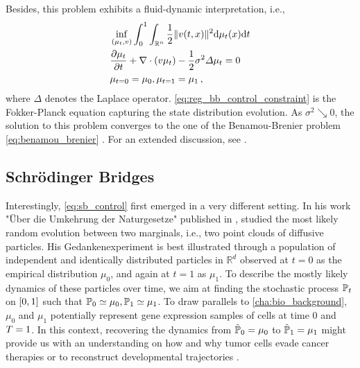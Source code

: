 Besides, this problem exhibits a fluid-dynamic interpretation, i.e.,
\begin{align}
	& \inf _{(\mu_t, v)} \int_0^1 \int_{\mathbb{R}^n}\frac{1}{2}\lVert v(t, x)\rVert^2 \mathrm{d}\mu_t(x) \mathrm{d} t \\
	\label{eq:reg_bb_control_constraint} & \frac{\partial \mu_t}{\partial t}+\nabla \cdot(v \mu_t) - \frac{1}{2}\sigma^2 \Delta \mu_t = 0 \\
	& \nonumber \mu_{t=0}=\mu_0, \mu_{t=1}=\mu_1\,,
\end{align}
where $\Delta$ denotes the Laplace operator.
\eqref{eq:reg_bb_control_constraint} is the Fokker-Planck equation capturing the state distribution evolution.
As $\sigma^2 \searrow 0$, the solution to this problem converges to the one of the Benamou-Brenier problem \eqref{eq:benamou_brenier} \citep{mikami2008optimal}.
For an extended discussion, see \citet{dai1991stochastic, mikami2000dynamical, mikami2002optimal}.


\subsection{Schr{\"o}dinger Bridges} \label{sec:background_sb}

Interestingly, \cref{eq:sb_control} first emerged in a very different setting.
In his work "{\"U}ber die Umkehrung der Naturgesetze" published in \citeyear{schrodinger1931umkehrung}, \citeauthor{schrodinger1931umkehrung} studied the most likely random evolution between two marginals, i.e., two point clouds of diffusive particles.
His Gedankenexperiment is best illustrated through a population of independent and identically distributed particles in $\mathbb{R}^d$ observed at $t=0$ as the empirical distribution $\mu_0$, and again at $t=1$ as $\mu_1$.
To describe the mostly likely dynamics of these particles over time, we aim at finding the stochastic process $\mathbb{P}_{{t}}$ on $[0,1]$ such that $\mathbb{P}_{{0}} \simeq \mu_0, \mathbb{P}_{{1}} \simeq \mu_1$.
To draw parallels to \cref{cha:bio_background}, $\mu_0$ and $\mu_1$ potentially represent gene expression samples of cells at time $0$ and $T=1$. In this context, recovering the dynamics from $\hat{\mathbb{P}}_{ {0} } = \mu_0$ to $\hat{\mathbb{P}}_{ {1}} = \mu_1$ might provide us with an understanding on how and why tumor cells evade cancer therapies \citep{frangieh2021multimodal} or to reconstruct developmental trajectories \citep{schiebinger2019optimal}.

